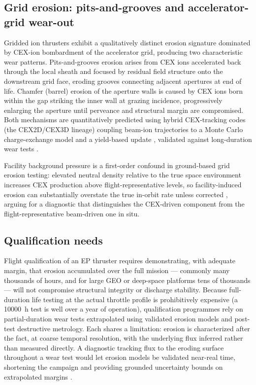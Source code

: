\subsection{Grid erosion: pits-and-grooves and accelerator-grid wear-out}

Gridded ion thrusters exhibit a qualitatively distinct erosion signature dominated by CEX-ion bombardment of the accelerator grid, producing two characteristic wear patterns. Pits-and-grooves erosion arises from CEX ions accelerated back through the local sheath and focused by residual field structure onto the downstream grid face, eroding grooves connecting adjacent apertures at end of life. Chamfer (barrel) erosion of the aperture walls is caused by CEX ions born within the gap striking the inner wall at grazing incidence, progressively enlarging the aperture until perveance and structural margin are compromised. Both mechanisms are quantitatively predicted using hybrid CEX-tracking codes (the CEX2D/CEX3D lineage) coupling beam-ion trajectories to a Monte Carlo charge-exchange model and a yield-based update \cite{ref0463}, validated against long-duration wear tests \cite{ref0480}.

Facility background pressure is a first-order confound in ground-based grid erosion testing: elevated neutral density relative to the true space environment increases CEX production above flight-representative levels, so facility-induced erosion can substantially overstate the true in-orbit rate unless corrected \cite{ref0461,ref0481}, arguing for a diagnostic that distinguishes the CEX-driven component from the flight-representative beam-driven one in situ.

\subsection{Qualification needs}

Flight qualification of an EP thruster requires demonstrating, with adequate margin, that erosion accumulated over the full mission — commonly many thousands of hours, and for large GEO or deep-space platforms tens of thousands — will not compromise structural integrity or discharge stability. Because full-duration life testing at the actual throttle profile is prohibitively expensive (a \SI{10000}{\hour} test is well over a year of operation), qualification programmes rely on partial-duration wear tests extrapolated using validated erosion models and post-test destructive metrology. Each shares a limitation: erosion is characterized after the fact, at coarse temporal resolution, with the underlying flux inferred rather than measured directly. A diagnostic tracking flux to the eroding surface throughout a wear test would let erosion models be validated near-real time, shortening the campaign and providing grounded uncertainty bounds on extrapolated margins \cite{ref0440}.

